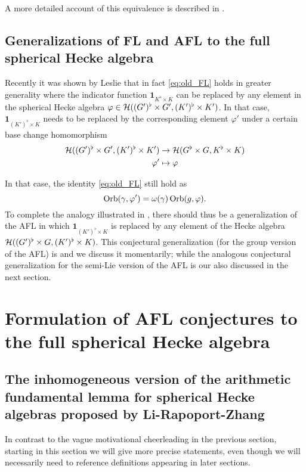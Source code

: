 A more detailed account of this equivalence is described in \cite[\S1.4]{ref:liuFJ}.

\subsection{Generalizations of FL and AFL to the full spherical Hecke algebra}
Recently it was shown by Leslie \cite{ref:leslie} that in fact
\eqref{eq:old_FL} holds in greater generality where the indicator function
$\mathbf{1}_{K^\flat \times K}$ can be replaced by any element in the spherical
Hecke algebra $\varphi \in \mathcal H((G')^\flat \times G', (K')^\flat \times K')$.
In that case, $\mathbf{1}_{(K')^\flat \times K}$ needs to be replaced
by the corresponding element $\varphi'$ under a certain base change homomorphism
\begin{align*}
  \mathcal H((G')^\flat \times G', (K')^\flat \times K') &\to \mathcal H(G^\flat \times G, K^\flat \times K) \\
  \varphi' &\mapsto \varphi
\end{align*}

In that case, the identity \eqref{eq:old_FL} still hold as
\begin{equation}
  \operatorname{Orb}(\gamma, \varphi') = \omega(\gamma) \operatorname{Orb}(g, \varphi).
  \label{eq:eq:leslie_FL}
\end{equation}
To complete the analogy illustrated in ,
there should thus be a generalization of the AFL in which
$\mathbf{1}_{(K')^\flat \times K}$ is replaced by any element of the Hecke algebra
$\mathcal H((G')^\flat \times G, (K')^\flat \times K)$.
This conjectural generalization
(for the group version of the AFL) is \cite{ref:AFLspherical}
and we discuss it momentarily;
while the analogous conjectural generalization for the semi-Lie version of the AFL
is our  also discussed in the next section.

\section{Formulation of AFL conjectures to the full spherical Hecke algebra}
\subsection{The inhomogeneous version of the arithmetic fundamental lemma for spherical Hecke algebras proposed by Li-Rapoport-Zhang}
In contrast to the vague motivational cheerleading in the previous section,
starting in this section we will give more precise statements,
even though we will necessarily need to reference definitions appearing in later sections.

